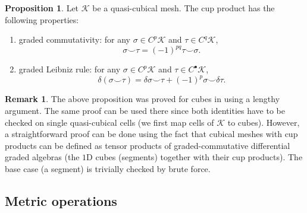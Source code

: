 \documentclass{elsarticle}
\theoremstyle{definition}
\newtheorem{proposition}[theorem]{Proposition}
\newtheorem{remark}[theorem]{Remark}
\begin{document}
\begin{proposition}
  Let $\mathcal{K}$ be a quasi-cubical mesh.
  The cup product has the following properties:
  \begin{enumerate}
    \item
      graded commutativity: for any $\sigma \in C^p \mathcal{K}$ and $\tau \in C^q \mathcal{K}$,
      \begin{equation}
        \sigma \smile \tau = (-1)^{p q} \tau \smile \sigma.
      \end{equation}
    \item
      graded Leibniz rule: for any $\sigma \in C^p \mathcal{K}$ and $\tau \in C^\bullet \mathcal{K}$,
      \begin{equation}
        \delta(\sigma \smile \tau) = \delta \sigma \smile \tau + (-1)^p \sigma \smile \delta \tau.
      \end{equation}
  \end{enumerate}
\end{proposition}
\begin{remark}
  The above proposition was proved for cubes in \cite[Theorem 3.2.3]{arnold2012discrete} using a lengthy argument.
  The same proof can be used there since both identities have to be checked on single quasi-cubical cells (we first map cells of $\mathcal{K}$ to cubes).
  However, a straightforward proof can be done using the fact that cubical meshes with cup products can be defined as tensor products of graded-commutative differential graded algebras (the $1$D cubes (segments) together with their cup products).
  The base case (a segment) is trivially checked by brute force.
\end{remark}

\subsection{Metric operations}
\end{document}
